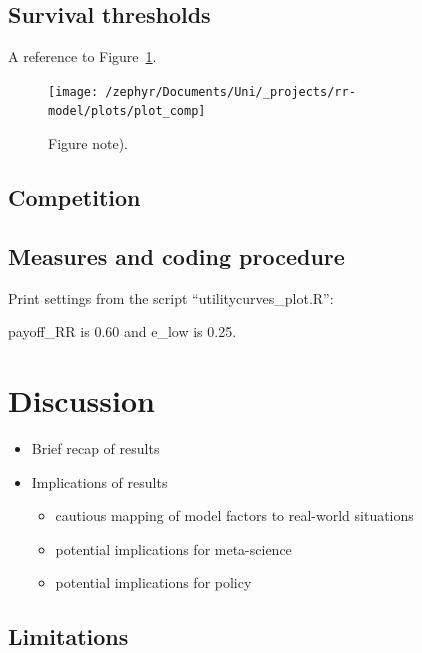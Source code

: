 \documentclass[british,,doc,mask,floatsintext]{apa6}
\providecommand{\tightlist}{%
  \setlength{\itemsep}{0pt}\setlength{\parskip}{0pt}}
\begin{document}
\hypertarget{survival-thresholds}{%
\subsection{Survival thresholds}\label{survival-thresholds}}

A reference to Figure~\ref{fig:competitionplot}.



\begin{figure}
\texttt{[image: /zephyr/Documents/Uni/\_projects/rr-model/plots/plot\_comp]} \caption{Figure note).}\label{fig:competitionplot}
\end{figure}

\hypertarget{competition}{%
\subsection{Competition}\label{competition}}

\hypertarget{measures-and-coding-procedure}{%
\subsection{Measures and coding procedure}\label{measures-and-coding-procedure}}

Print settings from the script \enquote{utilitycurves\_plot.R}:

payoff\_RR is \(0.60\) and e\_low is 0.25.

\hypertarget{discussion}{%
\section{Discussion}\label{discussion}}

\begin{itemize}
\tightlist
\item
  Brief recap of results
\item
  Implications of results

  \begin{itemize}
  \tightlist
  \item
    cautious mapping of model factors to real-world situations
  \item
    potential implications for meta-science
  \item
    potential implications for policy
  \end{itemize}
\end{itemize}

\hypertarget{limitations}{%
\subsection{Limitations}\label{limitations}}
\end{document}
